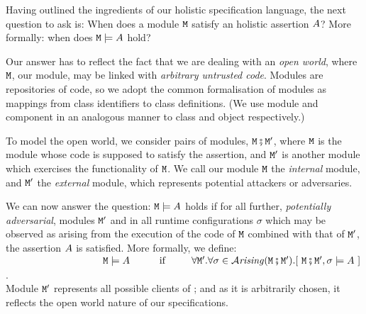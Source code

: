 
Having outlined the ingredients of our holistic specification
language, the next question to ask is: When does a module ${\mbox{\tt{\ensuremath{{\mbox{\tt{M}}}}}}}$ satisfy
an holistic assertion $A$?  More formally: when does
%
${\mbox{\tt{\ensuremath{{\mbox{\tt{M}}}}}}} \models A$ 
hold? 
  
Our answer has to reflect the fact that we are dealing with an 
\emph{open  world},  where  ${\mbox{\tt{\ensuremath{{\mbox{\tt{M}}}}}}}$, our module, may be
linked with \textit{arbitrary untrusted code}.
Modules are repositories of code, so we adopt the common formalisation 
of modules as  mappings from
class identifiers to class definitions.
(We use module and component in an analogous manner to class and object respectively.)

%
%
%
To model the open world, we consider
 pairs of modules, 
${\mbox{\tt{\ensuremath{{\mbox{\tt{M}}}}}}} \fatsemi {{\mbox{\tt{\ensuremath{{\mbox{\tt{M}}}}}}}'}$,  where ${\mbox{\tt{\ensuremath{{\mbox{\tt{M}}}}}}}$ is the module 
whose code is supposed to satisfy the assertion,
and ${\mbox{\tt{\ensuremath{{\mbox{\tt{M}}}}}}}'$  is  another %
 module which exercises
the functionality of ${\mbox{\tt{\ensuremath{{\mbox{\tt{M}}}}}}}$. We call our module ${\mbox{\tt{\ensuremath{{\mbox{\tt{M}}}}}}}$ the {\em internal} module, and
 ${\mbox{\tt{\ensuremath{{\mbox{\tt{M}}}}}}}'$ the {\em external} module, which represents potential
 attackers or adversaries.
    
We can now answer the question: ${\mbox{\tt{\ensuremath{{\mbox{\tt{M}}}}}}} \models A$ 
 holds if for all further, {\em potentially adversarial}, modules ${\mbox{\tt{\ensuremath{{\mbox{\tt{M}}}}}}}'$ and in  all runtime configurations $\sigma$ which may be observed as arising from the  execution of the code of ${\mbox{\tt{\ensuremath{{\mbox{\tt{M}}}}}}}$ combined with that of ${\mbox{\tt{\ensuremath{{\mbox{\tt{M}}}}}}}'$, the assertion $A$ is satisfied. More formally, we define:\\
$~ \strut  \hspace{1.3in} \M \models \A \ \ \  \ \ \ \ \ \mbox{
if               } \ \ \  \ \ \  \  \forall \M'.\forall \sigma\in\Arising
{\M \mkpair  {\M'}}. [\ \M \mkpair  {\M'},\sigma \models \A\ ]$.  \\
Module ${\mbox{\tt{\ensuremath{{\mbox{\tt{M}}}}}}}'$ represents all possible clients of {\M}; and as it is arbitrarily chosen, it reflects the open world nature of our specifications.%

